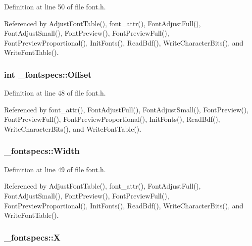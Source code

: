 Definition at line 50 of file font.\-h.



Referenced by Adjust\-Font\-Table(), font\-\_\-attr(), Font\-Adjust\-Full(), Font\-Adjust\-Small(), Font\-Preview(), Font\-Preview\-Full(), Font\-Preview\-Proportional(), Init\-Fonts(), Read\-Bdf(), Write\-Character\-Bits(), and Write\-Font\-Table().

\hypertarget{struct__fontspecs_ad4ef5755b58ecd3bbc9894cee258091e}{
\subsubsection[{Offset}]{\setlength{\rightskip}{0pt plus 5cm}int \-\_\-fontspecs\-::\-Offset}}\label{struct__fontspecs_ad4ef5755b58ecd3bbc9894cee258091e}


Definition at line 48 of file font.\-h.



Referenced by font\-\_\-attr(), Font\-Adjust\-Full(), Font\-Adjust\-Small(), Font\-Preview(), Font\-Preview\-Full(), Font\-Preview\-Proportional(), Init\-Fonts(), Read\-Bdf(), Write\-Character\-Bits(), and Write\-Font\-Table().

\hypertarget{struct__fontspecs_a8404888a24a2b065d91c4424e1907439}{
\subsubsection[{Width}]{ \-\_\-fontspecs\-::\-Width}}\label{struct__fontspecs_a8404888a24a2b065d91c4424e1907439}


Definition at line 49 of file font.\-h.



Referenced by Adjust\-Font\-Table(), font\-\_\-attr(), Font\-Adjust\-Full(), Font\-Adjust\-Small(), Font\-Preview(), Font\-Preview\-Full(), Font\-Preview\-Proportional(), Init\-Fonts(), Read\-Bdf(), Write\-Character\-Bits(), and Write\-Font\-Table().

\hypertarget{struct__fontspecs_a7273a891c79308389718266cb0b66f56}{
\subsubsection[{X}]{ \-\_\-fontspecs\-::\-X}}\label{struct__fontspecs_a7273a891c79308389718266cb0b66f56}


